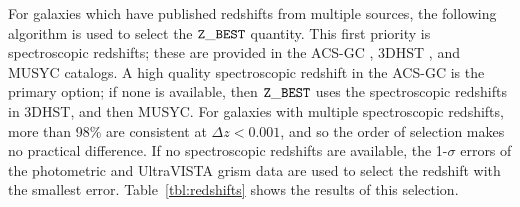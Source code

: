 \documentclass[twocolumn]{aastex6}
\begin{document}
For galaxies which have published redshifts from multiple sources, the following algorithm is used to select the $\tt Z\_BEST$ quantity. This first priority is spectroscopic redshifts; these are provided in the ACS-GC \citep{gri12}, 3DHST \citep{mom15}, and MUSYC \citep{car10} catalogs. A high quality spectroscopic redshift in the ACS-GC is the primary option; if none is available, then $\tt Z\_BEST$ uses the spectroscopic redshifts in 3DHST, and then MUSYC. For galaxies with multiple spectroscopic redshifts, more than 98\% are consistent at $\Delta z<0.001$, and so the order of selection makes no practical difference. If no spectroscopic redshifts are available, the 1-$\sigma$ errors of the photometric \citep[ACS-GC, 3DHST, MUSYC, UltraVISTA;][]{ilb13} and UltraVISTA grism data are used to select the redshift with the smallest error. Table~\ref{tbl:redshifts} shows the results of this selection. 
 
\end{document}
